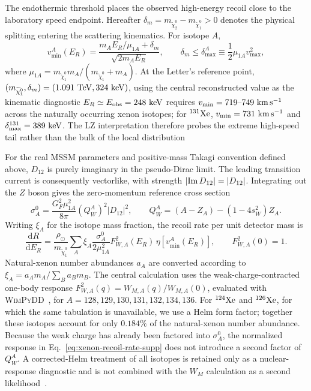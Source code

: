 \documentclass[%
  aps,
  prl,
  reprint,
  superscriptaddress,
  amsmath,
  amssymb,
  longbibliography
]{revtex4-2}
\begin{document}
The endothermic threshold places the observed high-energy recoil close to
the laboratory speed endpoint.  Hereafter
\(\delta_m=m_{\widetilde\chi_2^0}-m_{\widetilde\chi_1^0}>0\) denotes the
physical splitting entering the scattering kinematics.  For isotope \(A\),
\begin{equation}
 v_{\min}^A(E_R)=
 \frac{m_AE_R/\mu_{1A}+\delta_m}{\sqrt{2m_AE_R}},
 \qquad
 \delta_m\leq\delta_{\max}^A\equiv
 \frac{1}{2}\mu_{1A}v_{\max}^2,
 \label{eq:vmin-supp}
\end{equation}
where
\(\mu_{1A}=m_{\widetilde\chi_1^0}m_A/
(m_{\widetilde\chi_1^0}+m_A)\).  At the Letter's reference point,
\({(m_{\widetilde\chi_1^0},\delta_m)=(1.091~{\rm TeV},324~{\rm keV})}\),
using the central reconstructed value as the kinematic diagnostic
\(E_R\simeq E_{\rm obs}=248~{\rm keV}\) requires
\({v_{\min}=719\text{--}749~{\rm km\,s^{-1}}}\) across the naturally occurring
xenon isotopes; for \(^{131}{\rm Xe}\),
\({v_{\min}=731~{\rm km\,s^{-1}}}\) and
\(\delta_{\max}^{131}=389~{\rm keV}\).  The LZ interpretation therefore
probes the extreme high-speed tail rather than the bulk of the local
distribution %

For the real MSSM parameters and positive-mass Takagi convention defined
above, \(D_{12}\) is purely imaginary in the
pseudo-Dirac limit.  The leading transition current is consequently
vectorlike, with strength
\(|{\rm Im}\,D_{12}|=|D_{12}|\).  Integrating out the \(Z\) boson gives the
zero-momentum reference cross section
\begin{equation}
 \sigma_A^0=
 \frac{G_F^2\mu_{1A}^2}{8\pi}
 \left(Q_W^A\right)^2|D_{12}|^2,
 \qquad
 Q_W^A=(A-Z_A)-(1-4s_W^2)Z_A .
 \label{eq:xenon-transition-cross-section-supp}
\end{equation}
Writing \(\xi_A\) for the isotope mass fraction, the recoil rate per unit
detector mass is
\begin{equation}
 \frac{\mathrm{d}R}{\mathrm{d}E_R}=
 \frac{\rho_\odot}{m_{\widetilde\chi_1^0}}
 \sum_A\xi_A\frac{\sigma_A^0}{2\mu_{1A}^2}
 F_{W,A}^2(E_R)\,
 \eta\!\left[v_{\min}^A(E_R)\right],
 \qquad F_{W,A}^2(0)=1 .
 \label{eq:xenon-recoil-rate-supp}
\end{equation}
Natural-xenon number abundances \(a_A\) are converted according to
\(\xi_A=a_Am_A/\sum_Ba_Bm_B\).  The central calculation uses the
weak-charge-contracted one-body response
\(F_{W,A}^2(q)=W_{M,A}(q)/W_{M,A}(0)\), evaluated with
\textsc{WimPyDD}~\cite{Jeong:2021bpl},
for
\(A=128,129,130,131,132,134,136\).  For \(^{124}{\rm Xe}\) and
\(^{126}{\rm Xe}\), for which the same tabulation is unavailable, we use a
Helm form factor; together these isotopes account for only \(0.184\%\) of the
natural-xenon number abundance.  Because the weak charge has already been
factored into \(\sigma_A^0\), the normalized response in
Eq.~\eqref{eq:xenon-recoil-rate-supp} does not introduce a second factor of
\(Q_W^A\).  A corrected-Helm treatment of all isotopes is retained only as a
nuclear-response diagnostic and is not combined with the \(W_M\)
calculation as a second likelihood~\cite{Helm:1956zz,Lewin:1995rx}.
\end{document}

